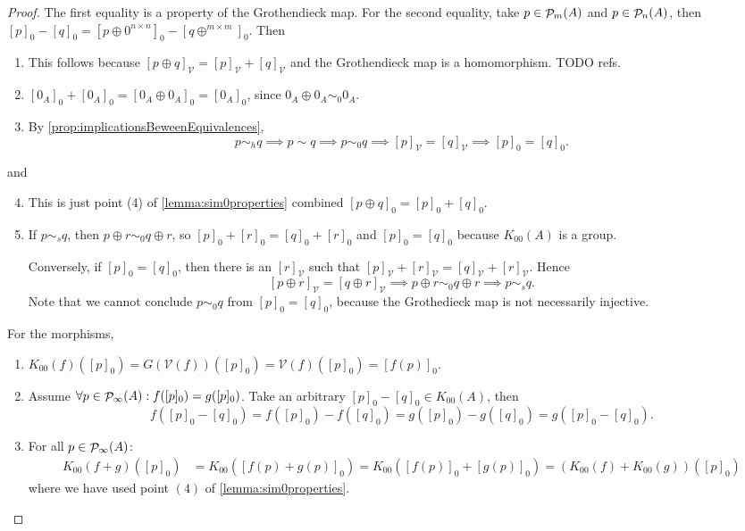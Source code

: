 \begin{proof}
The first equality is a property of the Grothendieck map. For the second equality, take $p\in\mathop{\mathcal{P}}\nolimits_m(A)$ and $p\in\mathop{\mathcal{P}}\nolimits_n(A)$, then $[p]_0 - [q]_0 = [p\oplus 0^{n\times n}]_0 - [q \oplus^{m\times m}]_0$.
Then
\begin{enumerate}
\item This follows because $[p\oplus q]_\mathcal{V} = [p]_\mathcal{V} + [q]_\mathcal{V}$ and the Grothendieck map is a homomorphism. TODO refs.
\item $[0_A]_0+[0_A]_0 = [0_A\oplus 0_A]_0 = [0_A]_0$, since $0_A\oplus 0_A \sim_0 0_A$.
\item By \ref{prop:implicationsBeweenEquivalences},
\[ p\sim_h q \implies p\sim q \implies p\sim_0 q \implies [p]_\mathcal{V} = [q]_\mathcal{V} \implies [p]_0 = [q]_0. \]
\end{enumerate}
and
\begin{enumerate}
\setcounter{enumi}{3}
\item This is just point (4) of \ref{lemma:sim0properties} combined $[p\oplus q]_0 = [p]_0+[q]_0$.
\item If $p\sim_s q$, then $p\oplus r \sim_0 q\oplus r$, so $[p]_0 +[r]_0 = [q]_0 + [r]_0$ and $[p]_0 = [q]_0$ because $K_{00}(A)$ is a group.

Conversely, if $[p]_0 = [q]_0$, then there is an $[r]_\mathcal{V}$ such that $[p]_\mathcal{V} + [r]_\mathcal{V} = [q]_\mathcal{V} + [r]_\mathcal{V}$. Hence
\[ [p\oplus r]_\mathcal{V} = [q\oplus r]_\mathcal{V} \implies p\oplus r \sim_0 q\oplus r \implies p\sim_s q. \]
Note that we cannot conclude $p \sim_0 q$ from $[p]_0 = [q]_0$, because the Grothedieck map is not necessarily injective.
\end{enumerate}
For the morphisms,
\begin{enumerate}
\item $K_{00}(f)([p]_0) = G(\mathcal{V}(f))([p]_0) = \mathcal{V}(f)([p]_0) = [f(p)]_0$.
\item Assume $ \forall p\in\mathop{\mathcal{P}}\nolimits_\infty(A): f([p]_0) = g([p]_0)$. Take an arbitrary $[p]_0-[q]_0\in K_{00}(A)$, then
\[ f([p]_0-[q]_0) = f([p]_0)-f([q]_0) = g([p]_0)-g([q]_0) = g([p]_0-[q]_0). \]
\item For all $p\in\mathop{\mathcal{P}}\nolimits_\infty(A)$:
\begin{align*}
K_{00}(f + g)([p]_0) &= K_{00}([f(p) + g(p)]_0) = K_{00}([f(p)]_0 + [g(p)]_0) =  (K_{00}(f) + K_{00}(g))([p]_0)
\end{align*}
where we have used point $(4)$ of \ref{lemma:sim0properties}.
\end{enumerate}
\end{proof}


